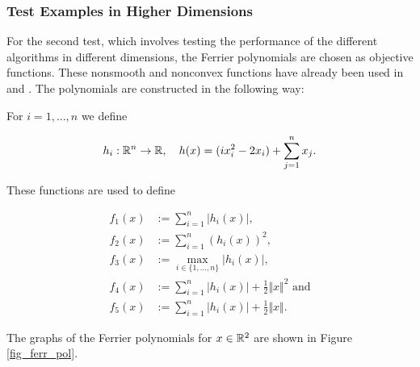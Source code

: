 \subsubsection{Test Examples in Higher Dimensions}
\label{sec_num_test_ferr}

For the second test, which involves testing the performance of the different algorithms in different dimensions, the Ferrier polynomials are chosen as objective functions. These nonsmooth and nonconvex functions have already been used in \cite{Hare2010} and \cite{Hare2016}. The polynomials are constructed in the following way:

For \(i = 1,...,n\) we define 

\begin{align*}
	h_i: \mathbb{R}^n \to \mathbb{R}, \quad h(x) = (ix_i^2-2x_i)+\sum_{j=1}^n x_j.
\end{align*}

These functions are used to define

\begin{align*}
	f_1(x) &:= \sum_{i=1}^n |h_i(x)|, \\
	f_2(x) &:= \sum_{i=1}^n (h_i(x))^2, \\
	f_3(x) &:= \max_{i \in \{1,...,n\}}|h_i(x)|, \\
	f_4(x) &:= \sum_{i=1}^n \vert h_i(x)\vert+\frac{1}{2}\Vert x\Vert^2 \text{ and} \\
	f_5(x) &:= \sum_{i=1}^n \vert h_i(x)\vert+\frac{1}{2}\Vert x\Vert.
\end{align*}


The graphs of the Ferrier polynomials for \(x \in \mathbb{R}^2\) are shown in Figure \ref{fig_ferr_pol}.

